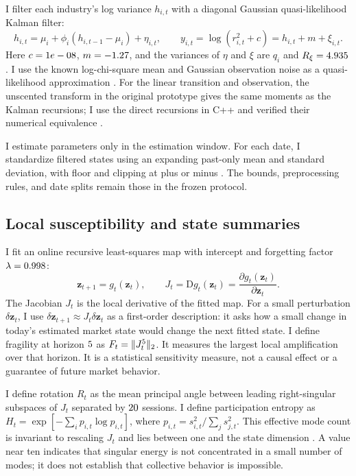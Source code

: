 \documentclass[11pt]{article}
\begin{document}
I filter each industry's log variance $h_{i,t}$ with a diagonal Gaussian quasi-likelihood Kalman filter:
\begin{equation}
 h_{i,t}=\mu_i+\phi_i(h_{i,t-1}-\mu_i)+\eta_{i,t},\qquad
 y_{i,t}=\log(r_{i,t}^{2}+c)=h_{i,t}+m+\xi_{i,t}.
\end{equation}
Here $c=1e-08$, $m=-1.27$, and the variances of $\eta$ and $\xi$ are $q_i$ and $R_\xi=4.935$. I use the known log-chi-square mean and Gaussian observation noise as a quasi-likelihood approximation \cite{HRS}. For the linear transition and observation, the unscented transform in the original prototype gives the same moments as the Kalman recursions; I use the direct recursions in C++ and verified their numerical equivalence \cite{Julier}.

I estimate parameters only in the estimation window. For each date, I standardize filtered states using an expanding past-only mean and standard deviation, with floor \StandardFloor{} and clipping at plus or minus \StandardClip. The bounds, preprocessing rules, and date splits remain those in the frozen protocol.

\subsection{Local susceptibility and state summaries}
I fit an online recursive least-squares map with intercept and forgetting factor $\lambda=0.998$:
\begin{equation}
 \mathbf z_{t+1}=g_t(\mathbf z_t),\qquad
 J_t=\mathrm{D}g_t(\mathbf z_t)=\frac{\partial g_t(\mathbf z_t)}{\partial\mathbf z_t}.
\end{equation}
The Jacobian $J_t$ is the local derivative of the fitted map. For a small perturbation $\delta\mathbf z_t$, I use $\delta\mathbf z_{t+1}\approx J_t\delta\mathbf z_t$ as a first-order description: it asks how a small change in today's estimated market state would change the next fitted state. I define fragility at horizon $5$ as $F_t=\lVert J_t^{5}\rVert_2$. It measures the largest local amplification over that horizon. It is a statistical sensitivity measure, not a causal effect or a guarantee of future market behavior.

I define rotation $R_t$ as the mean principal angle between leading right-singular subspaces of $J_t$ separated by $20$ sessions. I define participation entropy as $H_t=\exp[-\sum_i p_{i,t}\log p_{i,t}]$, where $p_{i,t}=s_{i,t}^2/\sum_j s_{j,t}^2$. This effective mode count is invariant to rescaling $J_t$ and lies between one and the state dimension \cite{Roy}. A value near ten indicates that singular energy is not concentrated in a small number of modes; it does not establish that collective behavior is impossible.
\end{document}
